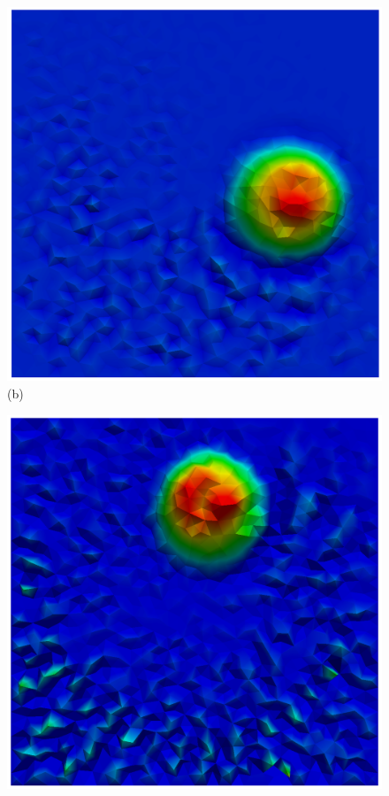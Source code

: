 \begin{figure}[H]
\begin{minipage}{.5\linewidth}
      \includegraphics[scale=0.2]{./02_chaps/cap_validation/figure/galerkin_300.png}\\
      (b)
     \end{minipage}
     \begin{minipage}{.5\linewidth}
      \centering
      \includegraphics[scale=0.2]{./02_chaps/cap_validation/figure/galerkin_600.png}\\

\end{minipage}
\end{figure}
